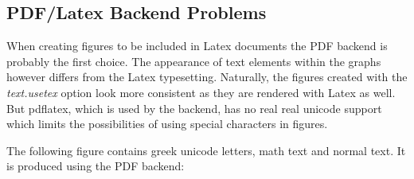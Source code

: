 \documentclass[12pt, a4paper]{article}
\begin{document}
\subsection*{PDF/Latex Backend Problems}

When creating figures to be included in Latex documents the PDF backend is probably the first choice. The appearance of text elements within the graphs however differs from the Latex typesetting. Naturally, the figures created with the \textit{text.usetex} option look more consistent as they are rendered with Latex as well. But pdflatex, which is used by the backend, has no real real unicode support which limits the possibilities of using special characters in figures.

The following figure contains greek unicode letters, math text and normal text. It is produced using the PDF backend:

\begin{figure}[h]
\hspace{1mm}
\end{figure}
\end{document}
